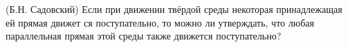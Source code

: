 (Б.Н. Садовский)
Если при движении твёрдой среды некоторая принадлежащая ей прямая движет
ся поступательно, то можно ли утверждать, что любая параллельная прямая 
этой среды также движется поступательно?
